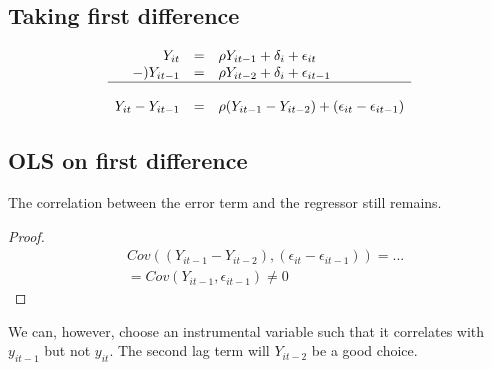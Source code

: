 \subsection{Taking first difference}

\begin{equation*}
    \begin{array}{rcl}
        Y_{it} &=& \rho Y_{it-1} + \delta_i + \epsilon_{it}   \\ 
        -) Y_{it-1} &=& \rho Y_{it-2} + \delta_i + \epsilon_{it-1}\\
        \cline{1-3}\\
        Y_{it}  - Y_{it-1} &=& \rho( Y_{it-1} -Y_{it-2}) + (\epsilon_{it} - \epsilon_{it-1}) \\ 
    \end{array}
\end{equation*}

\subsection{OLS on first difference}

The correlation between the error term and the regressor still remains.

\begin{proof}
    \begin{align*}
        & Cov((Y_{it-1} -Y_{it-2}), (\epsilon_{it} - \epsilon_{it-1})) = ... \\
        &= Cov(Y_{it-1}, \epsilon_{it-1}) \neq 0
    \end{align*}
\end{proof}

We can, however, choose an instrumental variable such that it correlates with $y_{it-1}$ but not $y_{it}$. 
The second lag term will $Y_{it-2}$ be a good choice.